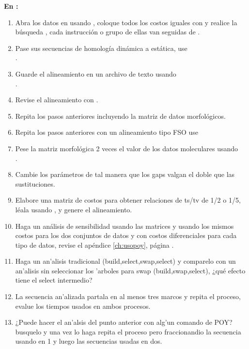 \textbf{En :}
\begin{enumerate}
\item Abra los datos en  usando , coloque todos los costos iguales con  y realice la b\'usqueda    , cada instrucci\'on o grupo de ellas van seguidas de .
\item Pase sus secuencias de homolog\'ia din\'amica a est\'atica, use \\ .
\item Guarde el alineamiento en un archivo de texto usando \\ .
\item Revise el alineamiento con .
\item Repita los pasos anteriores incluyendo la matriz de datos morfol\'ogicos.
\item Repita los pasos anteriores con un alineamiento tipo FSO use \\ 
\item Pese la matriz morfol\'ogica 2 veces el valor de los datos moleculares usando \\ .
\item Cambie los par\'ametros de tal manera que los gaps valgan el doble que las sustituciones.
\item Elabore una matriz de costos para obtener relaciones de ts/tv de  1/2 o  1/5, l\'eala usando , y genere el alineamiento.
\item Haga un an\'alisis de sensibilidad usando las matrices  y  usando los mismos costos para los dos conjuntos de datos y con costos diferenciales para cada tipo de datos, revise el ap\'endice \ref{ch:usopoy}, p\'agina \pageref{ch:usopoy}. 


\item Haga un an'alisis tradicional (build,select,swap,select) y
comparelo con un an'alisis sin seleccionar los 'arboles para swap
(build,swap,select), ¿qué efecto tiene el select intermedio?

\item La secuencia an'alizada partala en al menos tres marcos y repita el
proceso, evalue los tiempos usados en ambos procesos.

\item ¿Puede hacer el an'alsis del punto anterior con alg'un comando de POY?
busquelo y una vez lo haga repita el proceso pero fraccionandio la
secuencia usando en 1 y luego las secuencias usadas en dos.


\end{enumerate}

